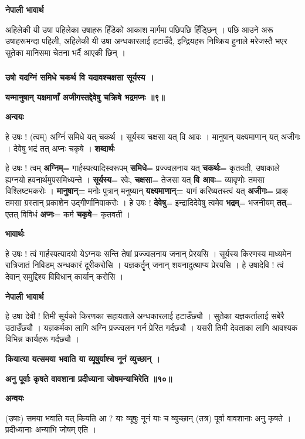 \documentclass[11pt, a5paper]{article}
\begin{document}
\textbf{नेपाली भावार्थ}

अहिलेकी यी उषा पहिलेका उषाहरू हिँडेको आकाश मार्गमा पछिपछि हिँड्छिन् । पछि आउने अरू उषाहरूभन्दा पहिली, अहिलेकी यी उषा अन्धकारलाई हटाउँदै, इन्द्रियहरू निष्क्रिय हुनाले मरेजस्तै भएर सुतेका मानिसमा चेतना भर्दै आएकी छिन् ।

\subsubsection{}

\textbf{उषो यदग्निं समिधे चकर्थ वि यदावश्चक्षसा सूर्यस्य ।}

\textbf{यन्मानुषान् यक्षमाणाँ अजीगस्तद्देवेषु चक्रिषे भद्रमप्नः ॥९॥}

\textbf{अन्वयः}

हे उषः ! (त्वम्) अग्निंं समिधे यत् चकर्थ । सूर्यस्य चक्षसा यत् वि आवः । मानुषान् यक्ष्यमाणान् यत् अजीगः । देवेषु भद्रं तत् अप्नः चकृषे । \textbf{शब्दार्थः}

हे उषः ! त्वम् \textbf{अग्निम्}= गार्हस्पत्यादिस्वरूपम् \textbf{समिधे}= प्रज्ज्वलनाय यत् \textbf{चकर्थः}= कृतवती, उषाकाले ह्यग्नयो हवनार्थमुपसमिध्यन्ते । \textbf{सूर्यस्य}= रवेः, \textbf{चक्षसा}= तेजसा यत् \textbf{वि आवः}= व्यावृणोः तमसा विश्लिष्टमकरोः । \textbf{मानुषान्=} मनोः पुत्रान् मनुष्यान् \textbf{यक्ष्यमाणान्=} यागं करिष्यतस्त्वं यत् \textbf{अजीगः}= प्राक् तमसा ग्रस्तान् प्रकाशेन उद्गीर्णानिवाकरोः । हे उषः ! \textbf{देवेषु}= इन्द्रादिदेवेषु त्वमेव \textbf{भद्रम्}= भजनीयम् \textbf{तत्}= एतत् विविधं \textbf{अप्नः}= कर्म \textbf{चकृषे}= कृतवती ।

\textbf{भावार्थः}

हे उषः ! त्वं गार्हस्पत्यादयो येऽग्नयः सन्ति तेषां प्रज्ज्वलनाय जनान् प्रेरयसि । सूर्यस्य किरणस्य माध्यमेन रात्रिजातं निविडम् अन्धकारं दूरीकरोसि । यज्ञकर्तॄन् जनान् शयनादुत्थाप्य प्रेरयसि । हे उषादेवि ! त्वं देवान् समुद्दिश्य विविधान् कार्यान् करोसि ।

\textbf{नेपाली भावार्थ}

हे उषा देवी !  तिमी सूर्यको किरणका  सहायताले अन्धकारलाई हटाउँछ्यौ । सुतेका यज्ञकर्तालाई सबेरै उठाउँछ्यौ । यज्ञकर्मका लागि अग्नि प्रज्ज्वलन गर्न प्रेरित गर्दछ्यौ । यसरी तिमी देवताका लागि आवश्यक विभिन्न कार्यहरू गर्दछ्यौ ।

\textbf{कियात्या यत्समया भवाति या व्यूषुर्याश्च नूनं व्युच्छान् ।}

\textbf{अनु पूर्वाः कृषते वावशाना प्रदीध्याना जोषमन्याभिरेति ॥१०॥}

\textbf{अन्वयः}

(उषाः) समया भवाति यत् कियति आ ? याः व्यूषुः नूनं याः च व्युच्छान् (तत्र) पूर्वा वावशानाः अनु कृषते । प्रदीध्यानाः अन्याभि जोषम् एति ।
\end{document}
